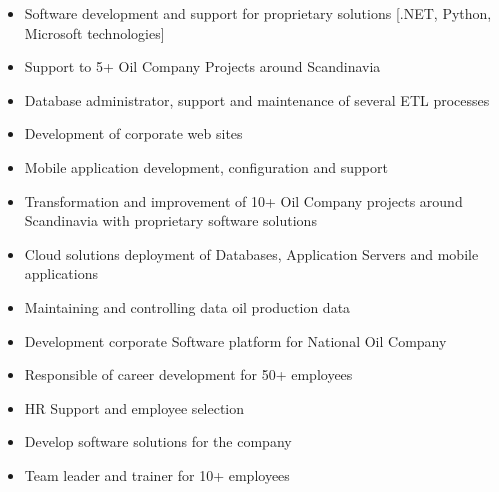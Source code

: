
\begin{itemize}
\item Software development and support for proprietary solutions [.NET, Python, Microsoft technologies]
\item Support to 5+ Oil Company Projects around Scandinavia
\item Database administrator, support and maintenance of several ETL processes
\item Development of corporate web sites
\item Mobile application development, configuration and support
\end{itemize}

\divider

\begin{itemize}
\item Transformation and improvement of 10+ Oil Company projects around Scandinavia with proprietary software solutions
\item Cloud solutions deployment of Databases, Application Servers and mobile applications
\item Maintaining and controlling data oil production data
\end{itemize}

\divider

\begin{itemize}
    \item Development corporate Software platform for National Oil Company
\end{itemize}
\divider


\begin{itemize}
\item Responsible of career development for 50+ employees
\item HR Support and employee selection
\end{itemize}


\begin{itemize}
\item Develop software solutions for the company
\item Team leader and trainer for 10+ employees
\end{itemize}

